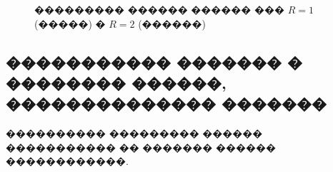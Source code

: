 \documentclass[a4paper]{article}
\begin{document}
        \begin{figure}[h]
          \begin{minipage}[h]{0.49\linewidth}
          \end{minipage}
          \hfill
          \begin{minipage}[h]{0.49\linewidth}
          \end{minipage}
          \caption{��������� ������ ������ ��� $R=1$ (�����) � $R=2$ (������)}
          \label{rr1}
        \end{figure}

\FloatBarrier
\subsection{����������� ������� � �������� ������, �������������� �������}
���������� ��������� ������ ����������� �� ������� ������ ������������.
\end{document}
